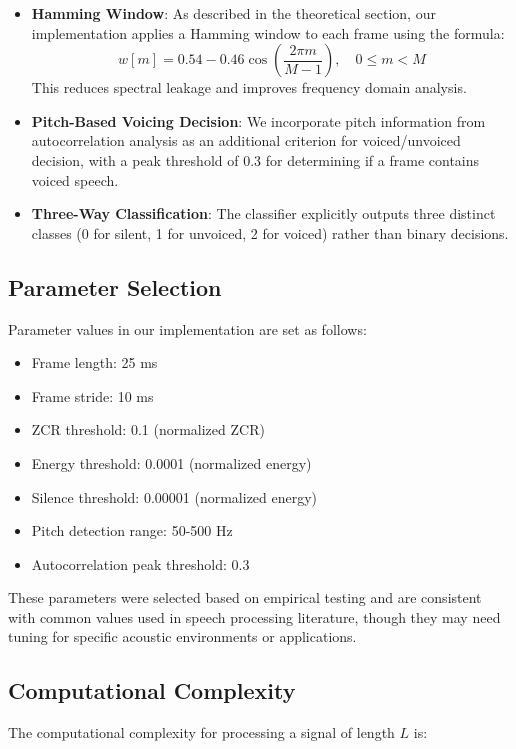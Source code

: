 \documentclass[10pt,journal,compsoc]{IEEEtran}
\begin{document}
\begin{itemize}
    \item \textbf{Hamming Window}: As described in the theoretical section, our implementation applies a Hamming window to each frame using the formula:
    \begin{equation}
    w[m] = 0.54 - 0.46 \cos\left(\frac{2\pi m}{M-1}\right), \quad 0 \leq m < M
    \end{equation}
    This reduces spectral leakage and improves frequency domain analysis.
    
    \item \textbf{Pitch-Based Voicing Decision}: We incorporate pitch information from autocorrelation analysis as an additional criterion for voiced/unvoiced decision, with a peak threshold of 0.3 for determining if a frame contains voiced speech.
    
    \item \textbf{Three-Way Classification}: The classifier explicitly outputs three distinct classes (0 for silent, 1 for unvoiced, 2 for voiced) rather than binary decisions.
\end{itemize}

\subsection{Parameter Selection}
Parameter values in our implementation are set as follows:

\begin{itemize}
    \item Frame length: 25 ms
    \item Frame stride: 10 ms
    \item ZCR threshold: 0.1 (normalized ZCR)
    \item Energy threshold: 0.0001 (normalized energy)
    \item Silence threshold: 0.00001 (normalized energy)
    \item Pitch detection range: 50-500 Hz
    \item Autocorrelation peak threshold: 0.3
\end{itemize}

These parameters were selected based on empirical testing and are consistent with common values used in speech processing literature, though they may need tuning for specific acoustic environments or applications.

\subsection{Computational Complexity}
The computational complexity for processing a signal of length $L$ is:
\end{document}
